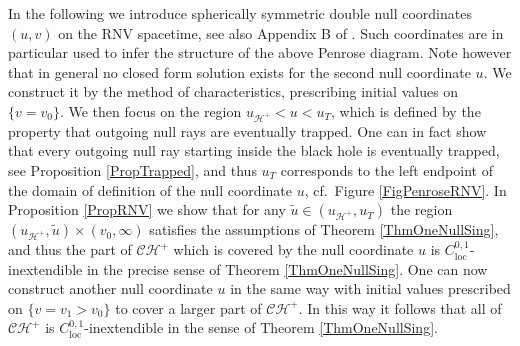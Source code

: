 \documentclass[reqno]{article}
\newcommand{\CH}{\mathcal{CH}^+}
\newcommand{\loc}{\mathrm{loc}}
\newcommand{\uh}{u_{\mathcal{H}^+}}
\begin{document}
In the following we introduce spherically symmetric double null coordinates $(u,v)$ on the RNV spacetime, see also Appendix B of \cite{PoiIs90}. Such coordinates are in particular used to infer the  structure of the above Penrose diagram. Note however that in general no closed form solution exists for the second null coordinate $u$. We construct it by the method of characteristics, prescribing initial values on $\{v = v_0\}$.  We then focus on the region $\uh < u < u_T$, which is defined by the property that outgoing null rays are eventually trapped. One can in fact show that every outgoing null ray starting inside the black hole is eventually trapped, see Proposition \ref{PropTrapped}, and thus $u_T$ corresponds to the left endpoint of the domain of definition of the null coordinate $u$, cf.\ Figure \ref{FigPenroseRNV}. In Proposition \ref{PropRNV} we show that for any $\tilde{u} \in (\uh, u_T)$ the region $(\uh, \tilde{u}) \times (v_0, \infty)$ satisfies the assumptions of Theorem \ref{ThmOneNullSing}, and thus the part of $\CH$ which is covered by the null coordinate $u$ is $C^{0,1}_{\loc}$-inextendible in the precise sense of Theorem \ref{ThmOneNullSing}.  One can now construct another null coordinate $u$ in the same way with initial values prescribed on $\{ v = v_1 > v_0\}$ to cover a larger part of $\CH$. In this way it follows that all of $\CH$ is $C^{0,1}_{\loc}$-inextendible in the sense of Theorem \ref{ThmOneNullSing}.
\end{document}
